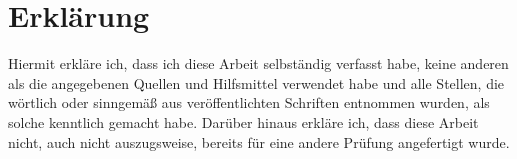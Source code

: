 \section*{Erklärung}


Hiermit erkläre ich, dass ich diese Arbeit selbständig verfasst habe, keine
anderen als die angegebenen Quellen und Hilfsmittel verwendet habe und alle
Stellen, die wörtlich oder sinngemäß aus veröffentlichten Schriften entnommen
wurden, als solche kenntlich gemacht habe. Darüber hinaus erkläre ich, dass
diese Arbeit nicht, auch nicht auszugsweise, bereits für eine andere Prüfung
angefertigt wurde.
